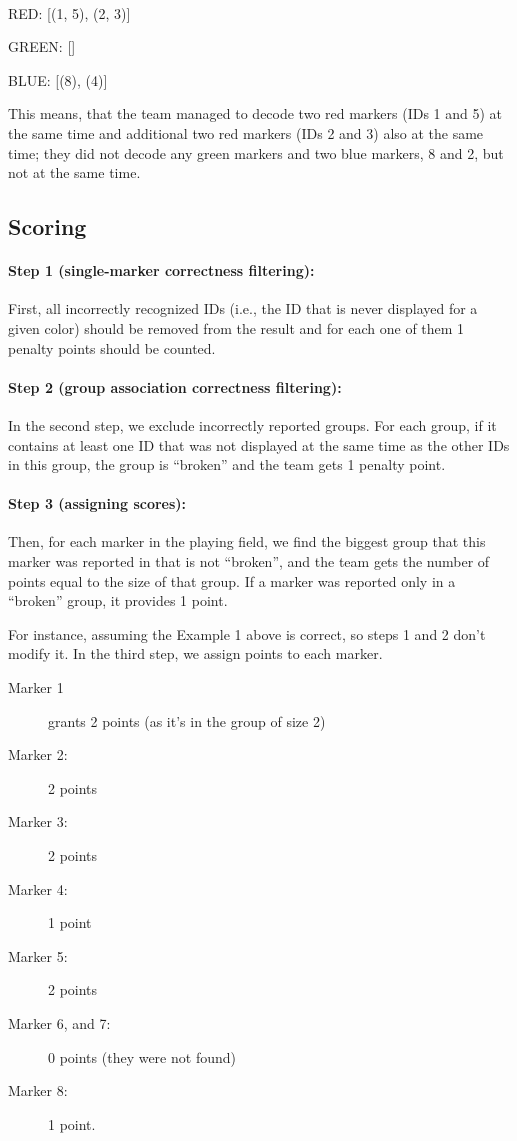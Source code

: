 \begin{example}
~

RED: [(1, 5), (2, 3)]

GREEN: []

BLUE: [(8), (4)]


This means, that the team managed to decode two red markers (IDs 1 and 5) at the same time and additional two red markers (IDs 2 and 3) also at the same time; they did not decode any green markers and two blue markers, 8 and 2, but not at the same time.
\end{example}

\subsection{Scoring}
\paragraph{Step 1 (single-marker correctness filtering):}

First, all incorrectly recognized IDs (i.e., the ID that is never displayed for a given color) should be removed from the result and for each one of them 1 penalty points should be counted.

\paragraph{Step 2 (group association correctness filtering):}

In the second step, we exclude incorrectly reported groups. For each group, if it contains at least one ID that was not displayed at the same time as the other IDs in this group, the group is “broken” and the team gets 1 penalty point.

\paragraph{Step 3 (assigning scores):}

Then, for each marker in the playing field, we find the biggest group that this marker was reported in that is not “broken”, and the team gets the number of points equal to the size of that group. If a marker was reported only in a “broken” group, it provides 1 point.

For instance, assuming the Example 1 above is correct, so steps 1 and 2 don’t modify it. In the third step, we assign points to each marker.

\begin{description}
    \item[Marker 1] grants 2 points (as it’s in the group of size 2)
    \item[Marker 2:] 2 points
    \item[Marker 3:] 2 points
    \item[Marker 4:] 1 point
    \item[Marker 5:] 2 points
    \item[Marker 6, and 7:] 0 points (they were not found)
    \item[Marker 8:] 1 point.
\end{description}

